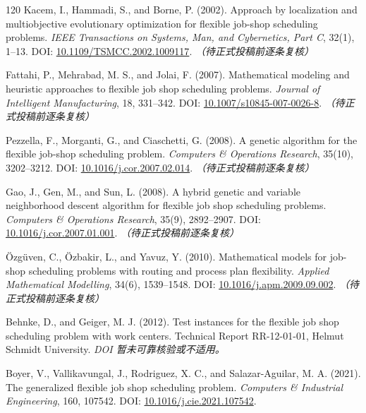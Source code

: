 \documentclass[UTF8,a4paper,11pt]{ctexart}
\begin{document}
\begin{thebibliography}{120}
Kacem, I., Hammadi, S., and Borne, P. (2002). Approach by localization and multiobjective evolutionary optimization for flexible job-shop scheduling problems. \emph{IEEE Transactions on Systems, Man, and Cybernetics, Part C}, 32(1), 1--13.
\newblock DOI: \href{https://doi.org/10.1109/TSMCC.2002.1009117}{10.1109/TSMCC.2002.1009117}. \textit{（待正式投稿前逐条复核）}

Fattahi, P., Mehrabad, M. S., and Jolai, F. (2007). Mathematical modeling and heuristic approaches to flexible job shop scheduling problems. \emph{Journal of Intelligent Manufacturing}, 18, 331--342.
\newblock DOI: \href{https://doi.org/10.1007/s10845-007-0026-8}{10.1007/s10845-007-0026-8}. \textit{（待正式投稿前逐条复核）}

Pezzella, F., Morganti, G., and Ciaschetti, G. (2008). A genetic algorithm for the flexible job-shop scheduling problem. \emph{Computers \& Operations Research}, 35(10), 3202--3212.
\newblock DOI: \href{https://doi.org/10.1016/j.cor.2007.02.014}{10.1016/j.cor.2007.02.014}. \textit{（待正式投稿前逐条复核）}

Gao, J., Gen, M., and Sun, L. (2008). A hybrid genetic and variable neighborhood descent algorithm for flexible job shop scheduling problems. \emph{Computers \& Operations Research}, 35(9), 2892--2907.
\newblock DOI: \href{https://doi.org/10.1016/j.cor.2007.01.001}{10.1016/j.cor.2007.01.001}. \textit{（待正式投稿前逐条复核）}

\"Ozg\"uven, C., \"Ozbakir, L., and Yavuz, Y. (2010). Mathematical models for job-shop scheduling problems with routing and process plan flexibility. \emph{Applied Mathematical Modelling}, 34(6), 1539--1548.
\newblock DOI: \href{https://doi.org/10.1016/j.apm.2009.09.002}{10.1016/j.apm.2009.09.002}. \textit{（待正式投稿前逐条复核）}

Behnke, D., and Geiger, M. J. (2012). Test instances for the flexible job shop scheduling problem with work centers. Technical Report RR-12-01-01, Helmut Schmidt University.
\newblock \textit{DOI 暂未可靠核验或不适用。}

Boyer, V., Vallikavungal, J., Rodriguez, X. C., and Salazar-Aguilar, M. A. (2021). The generalized flexible job shop scheduling problem. \emph{Computers \& Industrial Engineering}, 160, 107542.
\newblock DOI: \href{https://doi.org/10.1016/j.cie.2021.107542}{10.1016/j.cie.2021.107542}.


\end{thebibliography}
\end{document}
